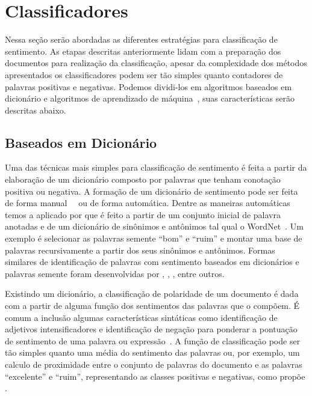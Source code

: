 \section{Classificadores}

Nessa seção serão abordadas as diferentes estratégias para classificação de
sentimento.
As etapas descritas anteriormente lidam com a preparação dos documentos para
realização da classificação, apesar da complexidade dos métodos apresentados os
classificadores podem ser tão simples quanto contadores de palavras positivas e
negativas.
Podemos dividi-los em algoritmos baseados em dicionário e algoritmos de
aprendizado de máquina~\cite{taboada11}, suas características serão descritas
abaixo.

\subsection{Baseados em Dicionário} \label{sec:dictionary}

Uma das técnicas mais simples para classificação de sentimento é feita a partir
da elaboração de um dicionário composto por palavras que tenham conotação
positiva ou negativa.
A formação de um dicionário de sentimento pode ser feita de forma
manual~\cite{stone66}~\cite{tong01} ou de forma automática.
Dentre as maneiras automáticas temos a aplicado por \citet{hu04} que é feito a
partir de um conjunto inicial de palavra anotadas e de um dicionário de
sinônimos e antônimos tal qual o WordNet~\cite{miller90}.
Um exemplo é selecionar as palavras semente ``bom'' e ``ruim'' e montar uma base de
palavras recursivamente a partir dos seus sinônimos e antônimos.
Formas similares de identificação de palavras com sentimento baseados em
dicionários e palavras semente foram desenvolvidas por \citet{blair08},
\citet{rao09}, \citet{hassan10}, entre outros.

Existindo um dicionário, a classificação de polaridade de um documento é dada
com a partir de alguma função dos sentimentos das palavras que o compõem.
É comum a inclusão algumas características sintáticas como identificação de
adjetivos intensificadores e identificação de negação para ponderar a pontuação
de sentimento de uma palavra ou expressão~\cite{taboada11}.
A função de classificação pode ser tão simples quanto uma média do sentimento
das palavras ou, por exemplo, um calculo de proximidade entre o conjunto de
palavras do documento e as palavras ``excelente'' e ``ruim'', representando as
classes positivas e negativas, como propõe \citet{turney02}.

